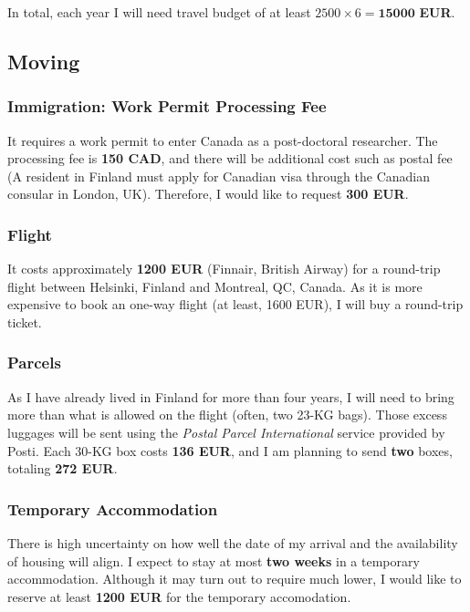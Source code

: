 \documentclass[11pt, oneside]{essay}
\begin{document}
In total, each year I will need travel budget of at least $2500
\times 6 = \mathbf{15000}$ \textbf{EUR}.


\subsection{Moving}

\subsubsection{Immigration: Work Permit Processing Fee}

It requires a work permit to enter Canada as a post-doctoral
researcher. The processing fee is \textbf{150 CAD}, and
there will be additional cost such as postal fee (A
resident in Finland must apply for Canadian visa through the
Canadian consular in London, UK). Therefore, I would like to
request \textbf{300 EUR}.

\subsubsection{Flight}

It costs approximately \textbf{1200 EUR} (Finnair, British
Airway) for a round-trip flight between Helsinki, Finland
and Montreal, QC, Canada. As it is more expensive to book an
one-way flight (at least, 1600 EUR), I will buy a round-trip
ticket. 

\subsubsection{Parcels}

As I have already lived in Finland for more than four years,
I will need to bring more than what is allowed on the flight
(often, two 23-KG bags). Those excess luggages will be sent
using the \textit{Postal Parcel International} service
provided by Posti. Each 30-KG box costs \textbf{136 EUR},
and I am planning to send \textbf{two} boxes, totaling
\textbf{272 EUR}.

\subsubsection{Temporary Accommodation}

There is high uncertainty on how well the date of my arrival and
the availability of housing will align. I expect to stay at most
\textbf{two weeks} in a temporary accommodation. Although it may
turn out to require much lower, I would like to reserve at least
\textbf{1200 EUR} for the temporary accomodation.
\end{document}

